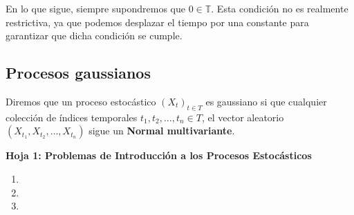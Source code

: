 En lo que sigue, siempre supondremos que $0\in \mathbb{T}$. Esta condición no es realmente restrictiva, ya que podemos desplazar el tiempo por una constante para garantizar que dicha condición se cumple.
\subsection{Procesos gaussianos}
\begin{definition}
   Diremos que un proceso estocástico $(X_t)_{t\in T}$ es gaussiano si que cualquier colección de índices temporales $t_1,t_2,\dots,t_n \in T$, el vector aleatorio $(X_{t_1}, X_{t_2},\dots,X_{t_n})$ sigue un \textbf{Normal multivariante}.
\end{definition}
\newpage
\begin{center}
    \textbf{\Large Hoja 1: Problemas de Introducción a los Procesos Estocásticos} 
\end{center}
\begin{enumerate}[label=\color{red}\textbf{\arabic*)}]
    \item {}
    \item {}
    \item {} 
\end{enumerate}

